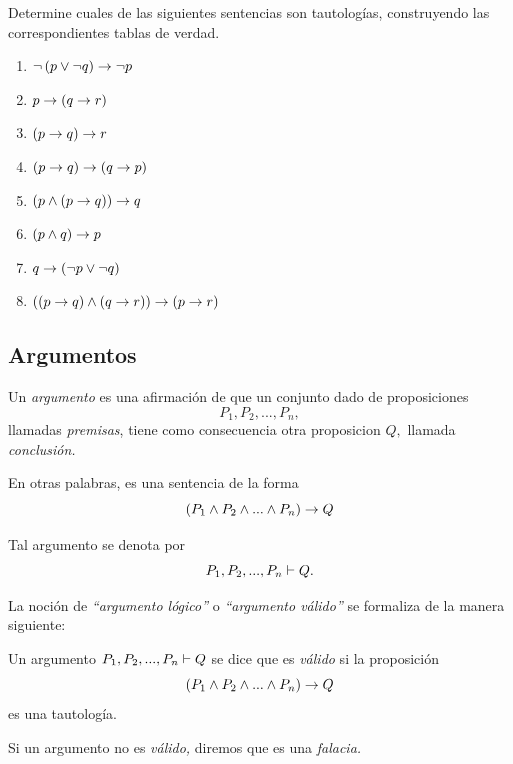 \documentclass[xcolor={svgnames},
  hyperref={colorlinks}, 
  spanish, 12pt]{beamer}
\numberwithin{equation}{section} %
\numberwithin{figure}{section} %
\begin{document}
\begin{frame}
 \begin{evc} Determine cuales de las siguientes sentencias son tautolog\'ias, construyendo las correspondientes tablas de verdad.
  \begin{enumerate}
   \item $\neg\left( p \vee \neg q \right) \rightarrow \neg p$
   \item $p \rightarrow \left( q\rightarrow r \right)$
   \item $\left( p \rightarrow q \right)\rightarrow r$
   \item $\left( p\rightarrow q \right) \rightarrow \left( q\rightarrow p \right)$
   \item $\left( p \wedge \left( p \rightarrow q \right) \right) \rightarrow q$
   \item $\left( p \wedge q \right) \rightarrow p$
   \item $q \rightarrow \left( \neg p \vee \neg q \right)$
   \item $\left( \left( p\rightarrow q \right) \wedge \left( q \rightarrow r \right) \right) \rightarrow \left( p \rightarrow r \right)$
  \end{enumerate}

 \end{evc}

\end{frame}

\subsection{Argumentos}

\begin{frame}
 Un \emph{argumento} es una afirmaci\'on de que un conjunto dado de proposiciones $$P_{1}, P_{2},...,P_{n},$$ llamadas \emph{premisas}, tiene como consecuencia otra proposicion $Q,$ llamada \emph{conclusi\'on.}\pause
 
 En otras palabras, es una sentencia de la forma
 $$
  \left( P_{1} \wedge P_{2} \wedge...\wedge P_{n}\right) \rightarrow Q
  $$
 
 \pause
 
 Tal argumento se denota por $$P_{1}, P_{2},...,P_{n} \vdash Q.$$
\end{frame}

\begin{frame}
 La noci\'on de \emph{``argumento l\'ogico''} o \emph{``argumento v\'alido''} se formaliza de la manera siguiente:
 \pause
 
 \begin{defn}
  \label{lip:4.4}
  Un argumento $P_{1}, P_{2},...,P_{n} \vdash Q$ se dice que es \emph{v\'alido} si la proposici\'on 
  $$
  \left( P_{1} \wedge P_{2} \wedge...\wedge P_{n}\right) \rightarrow Q
  $$ es una tautolog\'ia.\pause
  
   Si un argumento no es \emph{v\'alido,} diremos que es una \emph{falacia.}
 \end{defn}

\end{frame}
\end{document}
